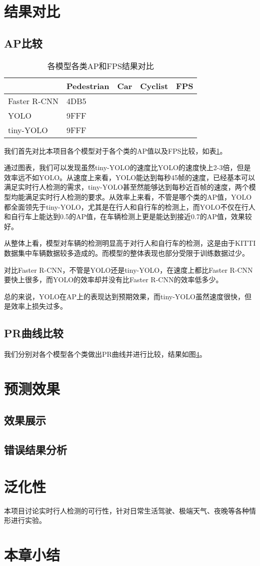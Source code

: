 \section{结果对比}{
	\subsection{AP比较}
	\begin{table}  
	\caption{各模型各类AP和FPS结果对比}  
	\begin{tabular}{l|p{2cm}p{2cm}p{2cm}p{2cm}}  
	\hline  
	             & Pedestrian & Car & Cyclist & FPS \\  
	\hline  
	Faster R-CNN & 4DB5 & & \\  
	YOLO         & 9FFF & & \\
	tiny-YOLO    & 9FFF & & \\
	\hline
	\end{tabular}
	\label{AP}
	\end{table} 
	我们首先对比本项目各个模型对于各个类的AP值以及FPS比较，如表\ref{AP}。

	通过图表，我们可以发现虽然tiny-YOLO的速度比YOLO的速度快上2-3倍，但是效率远不如YOLO。从速度上来看，YOLO能达到每秒45帧的速度，已经基本可以满足实时行人检测的需求，tiny-YOLO甚至然能够达到每秒近百帧的速度，两个模型均能满足实时行人检测的要求。从效率上来看，不管是哪个类的AP值，YOLO都全面领先于tiny-YOLO，尤其是在行人和自行车的检测上，而YOLO不仅在行人和自行车上能达到0.5的AP值，在车辆检测上更是能达到接近0.7的AP值，效果较好。

	从整体上看，模型对车辆的检测明显高于对行人和自行车的检测，这是由于KITTI数据集中车辆数据较多造成的。而模型的整体表现也部分受限于训练数据过少。

	对比Faster R-CNN，不管是YOLO还是tiny-YOLO，在速度上都比Faster R-CNN要快上很多，而YOLO的效率却并没有比Faster R-CNN的效率低多少。

	总的来说，YOLO在AP上的表现达到预期效果，而tiny-YOLO虽然速度很快，但是效率上损失过多。

	\subsection{PR曲线比较}
	我们分别对各个模型各个类做出PR曲线并进行比较，结果如图\ref{}。
}

\section{预测效果}{
	\subsection{效果展示}

	\subsection{错误结果分析}
}

\section{泛化性}{
	本项目讨论实时行人检测的可行性，针对日常生活驾驶、极端天气、夜晚等各种情形进行实验。
}

\section{本章小结}



